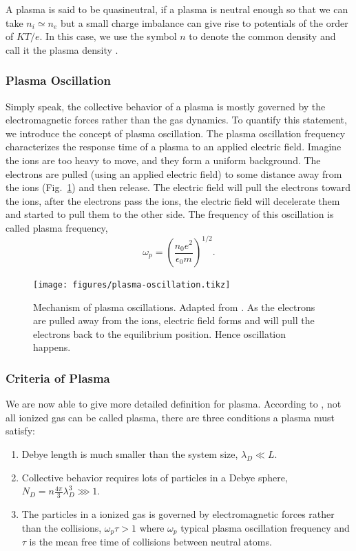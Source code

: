 A plasma is said to be quasineutral, if a plasma is neutral enough so that we can take $n_i \simeq n_e$ but a small charge imbalance can give rise to potentials of the order of $KT/e$. In this case, we use the symbol $n$ to denote the common density and call it the plasma density \cite{chen_introduction_2016}.

\subsubsection*{Plasma Oscillation}
Simply speak, the collective behavior of a plasma is mostly governed by the electromagnetic forces rather than the gas dynamics. To quantify this statement, we introduce the concept of plasma oscillation.
The plasma oscillation frequency characterizes the response time of a plasma to an applied electric field. Imagine the ions are too heavy to move, and they form a uniform background. The electrons are pulled (using an applied electric field) to some distance away from the ions (Fig.~\ref{fig:plasma-oscillation}) and then release. The electric field will pull the electrons toward the ions, after the electrons pass the ions, the electric field will decelerate them and started to pull them to the other side. The frequency of this oscillation is called plasma frequency,
\begin{equation}
	\omega_p = \left(\frac{n_0e^2}{\epsilon_0m}\right)^{1/2}.
\end{equation}

\begin{figure}[htbp]
	\centering
	\texttt{[image: figures/plasma-oscillation.tikz]}
	\caption{Mechanism of plasma oscillations. Adapted from \cite{chen_introduction_2016}. As the electrons are pulled away from the ions, electric field forms and will pull the electrons back to the equilibrium position. Hence oscillation happens.}
	\label{fig:plasma-oscillation}
\end{figure}

\subsubsection*{Criteria of Plasma}
We are now able to give more detailed definition for plasma. According to \cite{chen_introduction_2016}, not all ionized gas can be called plasma, there are three conditions a plasma must satisfy:
\begin{enumerate}
	\item Debye length is much smaller than the system size, $\lambda_D \ll L$.
	\item Collective behavior requires lots of particles in a Debye sphere, $N_D = n\frac{4\pi}{3}\lambda_D^3 \ggg 1$.
	\item The particles in a ionized gas is governed by electromagnetic forces rather than the collisions, $\omega_p\tau > 1$ where $\omega_p$ typical plasma oscillation frequency and $\tau$ is the mean free time of collisions between neutral atoms.
\end{enumerate}


